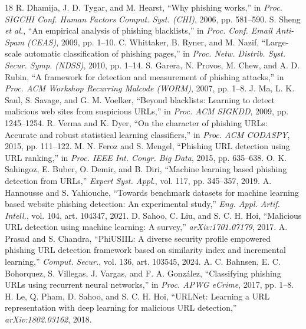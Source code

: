 \documentclass[12pt,a4paper]{report}
\begin{document}
\begin{thebibliography}{18}
 R. Dhamija, J. D. Tygar, and M. Hearst, ``Why phishing works,'' in \textit{Proc. SIGCHI Conf. Human Factors Comput. Syst. (CHI)}, 2006, pp. 581--590.
 S. Sheng \textit{et al.}, ``An empirical analysis of phishing blacklists,'' in \textit{Proc. Conf. Email Anti-Spam (CEAS)}, 2009, pp. 1--10.
 C. Whittaker, B. Ryner, and M. Nazif, ``Large-scale automatic classification of phishing pages,'' in \textit{Proc. Netw. Distrib. Syst. Secur. Symp. (NDSS)}, 2010, pp. 1--14.
 S. Garera, N. Provos, M. Chew, and A. D. Rubin, ``A framework for detection and measurement of phishing attacks,'' in \textit{Proc. ACM Workshop Recurring Malcode (WORM)}, 2007, pp. 1--8.
 J. Ma, L. K. Saul, S. Savage, and G. M. Voelker, ``Beyond blacklists: Learning to detect malicious web sites from suspicious URLs,'' in \textit{Proc. ACM SIGKDD}, 2009, pp. 1245--1254.
 R. Verma and K. Dyer, ``On the character of phishing URLs: Accurate and robust statistical learning classifiers,'' in \textit{Proc. ACM CODASPY}, 2015, pp. 111--122.
 M. N. Feroz and S. Mengel, ``Phishing URL detection using URL ranking,'' in \textit{Proc. IEEE Int. Congr. Big Data}, 2015, pp. 635--638.
 O. K. Sahingoz, E. Buber, O. Demir, and B. Diri, ``Machine learning based phishing detection from URLs,'' \textit{Expert Syst. Appl.}, vol. 117, pp. 345--357, 2019.
 A. Hannousse and S. Yahiouche, ``Towards benchmark datasets for machine learning based website phishing detection: An experimental study,'' \textit{Eng. Appl. Artif. Intell.}, vol. 104, art. 104347, 2021.
 D. Sahoo, C. Liu, and S. C. H. Hoi, ``Malicious URL detection using machine learning: A survey,'' \textit{arXiv:1701.07179}, 2017.
 A. Prasad and S. Chandra, ``PhiUSIIL: A diverse security profile empowered phishing URL detection framework based on similarity index and incremental learning,'' \textit{Comput. Secur.}, vol. 136, art. 103545, 2024.
 A. C. Bahnsen, E. C. Bohorquez, S. Villegas, J. Vargas, and F. A. Gonz{\'a}lez, ``Classifying phishing URLs using recurrent neural networks,'' in \textit{Proc. APWG eCrime}, 2017, pp. 1--8.
 H. Le, Q. Pham, D. Sahoo, and S. C. H. Hoi, ``URLNet: Learning a URL representation with deep learning for malicious URL detection,'' \textit{arXiv:1802.03162}, 2018.

\end{thebibliography}
\end{document}
